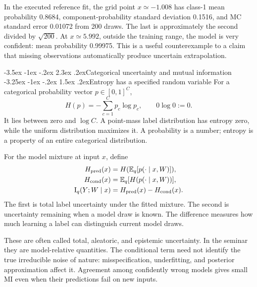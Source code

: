 \documentclass[11pt,a4paper]{article}
\makeatletter
\newcommand{\E}{\mathbb E}
\newcommand{\MI}{\operatorname{I}}
\renewcommand\section{\@startsection{section}{1}{\z@}%
  {-3.5ex \@plus -1ex \@minus -.2ex}%
  {2.3ex \@plus .2ex}{\normalfont\Large}}
\renewcommand\subsection{\@startsection{subsection}{2}{\z@}%
  {-3.25ex \@plus -1ex \@minus -.2ex}%
  {1.5ex \@plus .2ex}{\normalfont\large}}
\makeatother
\begin{document}
In the executed reference fit, the grid point $x\simeq-1.008$ has class-1
mean probability 0.8684, component-probability standard deviation 0.1516,
and MC standard error 0.01072 from 200 draws. The last is approximately the
second divided by $\sqrt{200}$. At $x\simeq5.992$, outside the training
range, the model is very confident: mean probability 0.99975. This is a
useful counterexample to a claim that missing observations automatically
produce uncertain extrapolation.

\section{Categorical uncertainty and mutual information}
\subsection{Entropy has a specified random variable}
For a categorical probability vector $p\in[0,1]^C$,
\[
 H(p)=-\sum_{c=1}^C p_c\log p_c,\qquad 0\log0:=0.
\]
It lies between zero and $\log C$. A point-mass label distribution has entropy
zero, while the uniform distribution maximizes it. A probability is a number;
entropy is a property of an entire categorical distribution.

For the model mixture at input $x$, define
\begin{align*}
 H_{\rm pred}(x)&=H(\E_q[p(\cdot\mid x,W)]),\\
 H_{\rm cond}(x)&=\E_q[H(p(\cdot\mid x,W))],\\
 \MI_q(Y;W\mid x)&=H_{\rm pred}(x)-H_{\rm cond}(x).
\end{align*}
The first is total label uncertainty under the fitted mixture. The second
is uncertainty remaining when a model draw is known. The difference measures
how much learning a label can distinguish current model draws.

These are often called total, aleatoric, and epistemic uncertainty. In the
seminar they are model-relative quantities. The conditional term need not
identify the true irreducible noise of nature: misspecification, underfitting,
and posterior approximation affect it. Agreement among confidently wrong
models gives small MI even when their predictions fail on new inputs.
\end{document}

